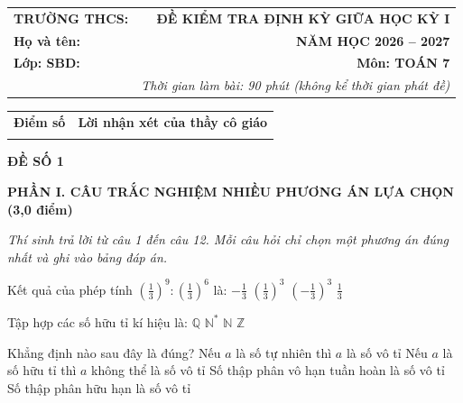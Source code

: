 \documentclass[12pt,a4paper]{article}
\begin{document}
\noindent
\begin{tabularx}{\linewidth}{X r}
\textbf{TRƯỜNG THCS: \dotfill} & \textbf{ĐỀ KIỂM TRA ĐỊNH KỲ GIỮA HỌC KỲ I} \\
\textbf{Họ và tên: \dotfill} & \textbf{NĂM HỌC 2026 -- 2027} \\
\textbf{Lớp: \dotfill \quad SBD: \dotfill} & \textbf{Môn: TOÁN 7} \\
& \textit{Thời gian làm bài: 90 phút (không kể thời gian phát đề)}
\end{tabularx}

\vspace{1.5mm}
\noindent
\begin{tabularx}{\linewidth}{|p{3.5cm}|X|}
\hline
\centering\textbf{Điểm số} & \centering\textbf{Lời nhận xét của thầy cô giáo} \tabularnewline
\rule{0pt}{1.6cm} & \\
\hline
\end{tabularx}

\vspace{2.5mm}
\begin{center}
\textbf{\large ĐỀ SỐ 1}
\end{center}

\noindent\textbf{\large PHẦN I. CÂU TRẮC NGHIỆM NHIỀU PHƯƠNG ÁN LỰA CHỌN (3,0 điểm)}

\textit{Thí sinh trả lời từ câu 1 đến câu 12. Mỗi câu hỏi chỉ chọn một phương án đúng nhất và ghi vào bảng đáp án.}

\vspace{1mm}
\begin{ex}
Kết quả của phép tính $\left(\frac{1}{3}\right)^9 : \left(\frac{1}{3}\right)^6$ là:
\choice
{$-\frac{1}{3}$}
{\True $\left(\frac{1}{3}\right)^3$}
{$\left(-\frac{1}{3}\right)^3$}
{$\frac{1}{3}$}
\end{ex}

\begin{ex}
Tập hợp các số hữu tỉ kí hiệu là:
\choice
{\True $\mathbb{Q}$}
{$\mathbb{N}^*$}
{$\mathbb{N}$}
{$\mathbb{Z}$}
\end{ex}

\begin{ex}
Khẳng định nào sau đây là đúng?
\choice
{Nếu $a$ là số tự nhiên thì $a$ là số vô tỉ}
{\True Nếu $a$ là số hữu tỉ thì $a$ không thể là số vô tỉ}
{Số thập phân vô hạn tuần hoàn là số vô tỉ}
{Số thập phân hữu hạn là số vô tỉ}
\end{ex}
\end{document}
